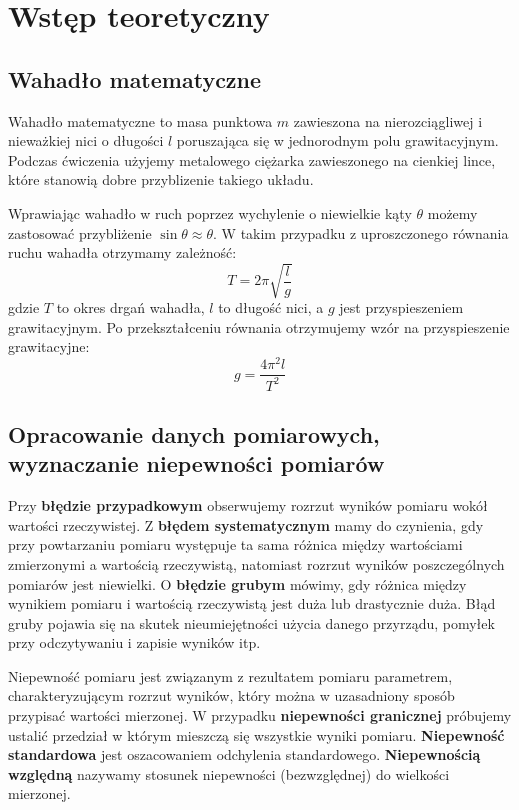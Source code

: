 \documentclass[a4paper,10pt,twoside]{article}
\begin{document}
\section{Wstęp teoretyczny}

\subsection{Wahadło matematyczne}

Wahadło matematyczne to masa punktowa $m$ zawieszona na nierozciągliwej i nieważkiej nici o długości $l$ poruszająca się w jednorodnym polu grawitacyjnym. Podczas ćwiczenia użyjemy metalowego ciężarka zawieszonego na cienkiej lince, które stanowią dobre przyblizenie takiego układu.

Wprawiając wahadło w ruch poprzez wychylenie o niewielkie kąty $\theta$ możemy zastosować przybliżenie $\sin\theta\approx\theta$. W takim przypadku z uproszczonego równania ruchu wahadła otrzymamy zależność: $$T = 2\pi\sqrt{\frac{l}{g}}$$gdzie $T$ to okres drgań wahadła, $l$ to długość nici, a $g$ jest przyspieszeniem grawitacyjnym. Po przekształceniu równania otrzymujemy wzór na przyspieszenie grawitacyjne: $$g = \frac{4\pi^2l}{T^2}$$

\subsection{Opracowanie danych pomiarowych, wyznaczanie niepewności pomiarów}

Przy \textbf{błędzie przypadkowym} obserwujemy rozrzut wyników pomiaru wokół wartości rzeczywistej. Z \textbf{błędem systematycznym} mamy do czynienia, gdy przy powtarzaniu pomiaru występuje ta sama różnica między wartościami zmierzonymi a wartością rzeczywistą, natomiast rozrzut wyników poszczególnych pomiarów jest niewielki. O \textbf{błędzie grubym} mówimy, gdy różnica między wynikiem pomiaru i wartością rzeczywistą jest duża lub drastycznie duża. Błąd gruby pojawia się na skutek nieumiejętności użycia danego przyrządu, pomyłek przy odczytywaniu i zapisie wyników itp.

Niepewność pomiaru jest związanym z rezultatem pomiaru parametrem, charakteryzującym rozrzut wyników, który można w uzasadniony sposób przypisać wartości mierzonej. W przypadku \textbf{niepewności granicznej} próbujemy ustalić przedział w którym mieszczą się wszystkie wyniki pomiaru. \textbf{Niepewność standardowa} jest oszacowaniem odchylenia standardowego. \textbf{Niepewnością względną} nazywamy stosunek niepewności (bezwzględnej) do wielkości mierzonej.
\end{document}
